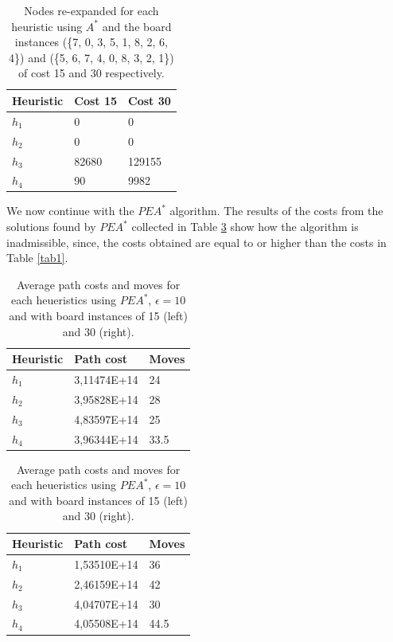 \documentclass[runningheads]{llncs}
\begin{document}
\begin{table}
    \centering
    \begin{tabular}{|l|l|l|}
    \hline
    Heuristic & Cost 15 & Cost 30\\
    \hline
    $h_1$ & 0 & 0\\
    $h_2$ & 0 & 0\\
    $h_3$ & 82680 & 129155 \\
    $h_4$ & 90 & 9982\\
    \hline
    \end{tabular}
    \caption{Nodes re-expanded for each heuristic using $A^*$ and the board instances (\{7, 0, 3, 5, 1, 8, 2, 6, 4\}) and (\{5, 6, 7, 4, 0, 8, 3, 2, 1\}) of cost 15 and 30 respectively. }\label{tab3}
\end{table}

We now continue with the $PEA^*$ algorithm.
The results of the costs from the solutions found by $PEA^*$ collected in Table \ref{tab2}
show how the algorithm is inadmissible, since, the costs obtained are equal to or higher than the costs in Table \ref{tab1}.

\begin{table}[!htb]
    \caption{Average path costs and moves for each heueristics using $PEA^*$, $\epsilon=10$ and with board instances of 15 (left) and 30 (right).}\label{tab2}
    \begin{minipage}{.5\linewidth}
      \centering
      \begin{tabular}{|l|l|l|}
        \hline
        Heuristic & Path cost & Moves\\
        \hline
        $h_1$ & 3,11474E+14    & 24\\
        $h_2$ & 3,95828E+14    & 28\\
        $h_3$ & 4,83597E+14    & 25\\
        $h_4$ & 3,96344E+14    & 33.5\\
        \hline
        \end{tabular}
    \end{minipage}%
    \begin{minipage}{.5\linewidth}
      \centering
        \begin{tabular}{|l|l|l|}
            \hline 
            Heuristic & Path cost & Moves\\
            \hline
            $h_1$ & 1,53510E+14    & 36\\
            $h_2$ & 2,46159E+14    & 42\\
            $h_3$ & 4,04707E+14    & 30\\
            $h_4$ & 4,05508E+14    & 44.5\\
            \hline
            \end{tabular}
    \end{minipage} 
\end{table}
\end{document}
